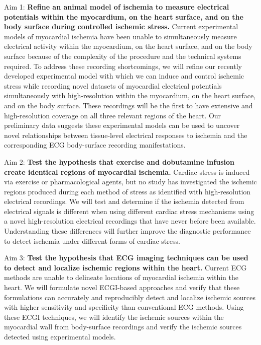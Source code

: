 \begin{desclist}
	
  \item [Aim 1:] \textbf{Refine an animal model of ischemia to measure
      electrical potentials within the myocardium, on the heart surface,
      and on the body surface during controlled ischemic stress.} Current
      experimental models of myocardial ischemia have been unable to
      simultaneously measure electrical activity within the myocardium, on
      the heart surface, and on the body surface because of the complexity
      of the procedure and the technical systems required. To address these
      recording shortcomings, we will refine our recently developed experimental
      model with which we can induce and control ischemic stress while
      recording novel datasets of myocardial electrical potentials simultaneously with high-resolution
      within the myocardium, on the heart surface, and on the body
      surface. These recordings will be the first to have extensive and high-resolution coverage on all three relevant regions of the heart. Our preliminary data suggests these experimental models can
      be used to uncover novel relationships between tissue-level
      electrical responses to ischemia and the corresponding ECG
      body-surface recording manifestations.
	
    \item [Aim 2:] \textbf{Test the hypothesis that exercise and dobutamine
        infusion create identical regions of myocardial ischemia.} Cardiac
      stress is induced via exercise or pharmacological agents, but no
      study has investigated the ischemic regions produced during each
      method of stress as identified with high-resolution electrical recordings. We will test and determine if the ischemia detected
      from electrical signals is different when using different cardiac
      stress mechanisms using a novel high-resolution electrical recordings
      that have never before been available. Understanding these
      differences will further improve the diagnostic performance to detect
      ischemia under different forms of cardiac stress.
	
    \item [Aim 3:] \textbf{Test the hypothesis that ECG imaging techniques
        can be used to detect and localize ischemic regions within the heart.} Current ECG methods are unable to delineate locations of
      myocardial ischemia within the heart. We will formulate novel
      ECGI-based approaches and verify that these formulations can
      accurately and reproducibly detect and localize ischemic sources with
      higher sensitivity and specificity than conventional ECG
      methods. Using these ECGI techniques, we will identify the ischemic
      sources within the myocardial wall from body-surface recordings and
      verify the ischemic sources detected using experimental models.
	

\end{desclist}
